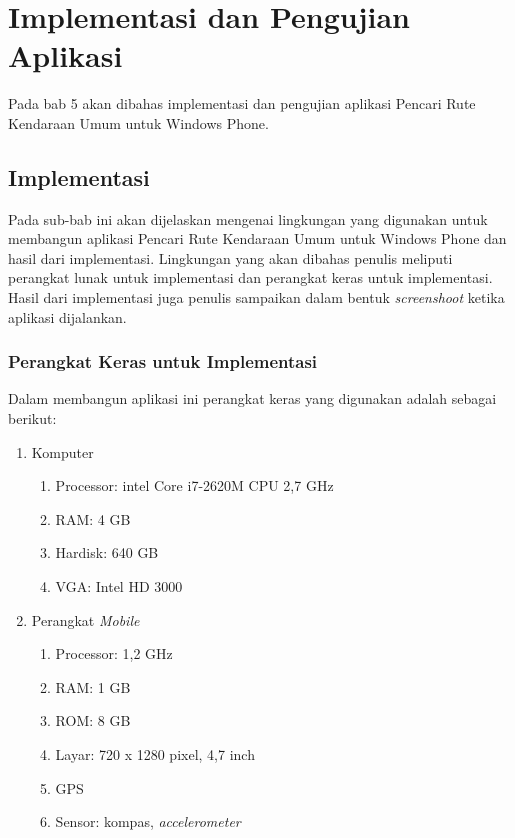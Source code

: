 \chapter{Implementasi dan Pengujian Aplikasi}
\label{chap:Implementasi dan Pengujian Aplikasi}

Pada bab 5 akan dibahas implementasi dan pengujian aplikasi Pencari Rute Kendaraan Umum untuk Windows Phone.

\section{Implementasi}
\label{lab:Implementasi}
\hspace{0.5cm} Pada sub-bab ini akan dijelaskan mengenai lingkungan yang digunakan untuk membangun aplikasi Pencari Rute Kendaraan Umum untuk Windows Phone dan hasil dari implementasi. Lingkungan yang akan dibahas penulis meliputi perangkat lunak untuk implementasi dan perangkat keras untuk implementasi. Hasil dari implementasi juga penulis sampaikan dalam bentuk \textit{screenshoot} ketika aplikasi dijalankan.

\subsection{Perangkat Keras untuk Implementasi}
\label{lab:Perangkat Keras untuk Implementasi}
\hspace{0.5cm} Dalam membangun aplikasi ini perangkat keras yang digunakan adalah sebagai berikut:
\begin{enumerate}
	\item Komputer
		\begin{enumerate}
			\item Processor: intel Core i7-2620M CPU 2,7 GHz
			\item RAM: 4 GB
			\item Hardisk: 640 GB
			\item VGA: Intel HD 3000
		\end{enumerate}
		
	\item Perangkat \textit{Mobile}
		\begin{enumerate}
			\item Processor: 1,2 GHz
			\item RAM: 1 GB
			\item ROM: 8 GB
			\item Layar: 720 x 1280 pixel, 4,7 inch
			\item GPS
			\item Sensor: kompas, \textit{accelerometer}
		\end{enumerate}
\end{enumerate}

